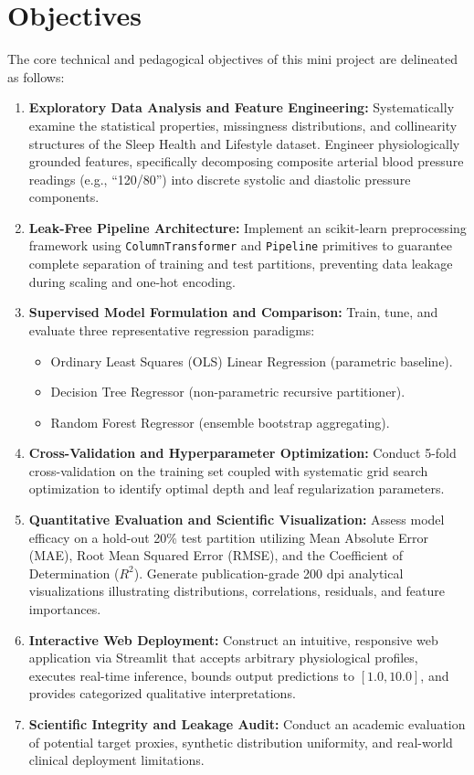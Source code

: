 \documentclass[12pt,a4paper]{article}
\begin{document}
\section{Objectives}
The core technical and pedagogical objectives of this mini project are delineated as follows:
\begin{enumerate}
    \item \textbf{Exploratory Data Analysis and Feature Engineering:} Systematically examine the statistical properties, missingness distributions, and collinearity structures of the Sleep Health and Lifestyle dataset. Engineer physiologically grounded features, specifically decomposing composite arterial blood pressure readings (e.g., ``120/80'') into discrete systolic and diastolic pressure components.
    \item \textbf{Leak-Free Pipeline Architecture:} Implement an scikit-learn preprocessing framework using \texttt{ColumnTransformer} and \texttt{Pipeline} primitives to guarantee complete separation of training and test partitions, preventing data leakage during scaling and one-hot encoding.
    \item \textbf{Supervised Model Formulation and Comparison:} Train, tune, and evaluate three representative regression paradigms:
    \begin{itemize}
        \item Ordinary Least Squares (OLS) Linear Regression (parametric baseline).
        \item Decision Tree Regressor (non-parametric recursive partitioner).
        \item Random Forest Regressor (ensemble bootstrap aggregating).
    \end{itemize}
    \item \textbf{Cross-Validation and Hyperparameter Optimization:} Conduct 5-fold cross-validation on the training set coupled with systematic grid search optimization to identify optimal depth and leaf regularization parameters.
    \item \textbf{Quantitative Evaluation and Scientific Visualization:} Assess model efficacy on a hold-out 20\% test partition utilizing Mean Absolute Error (MAE), Root Mean Squared Error (RMSE), and the Coefficient of Determination ($R^2$). Generate publication-grade 200 dpi analytical visualizations illustrating distributions, correlations, residuals, and feature importances.
    \item \textbf{Interactive Web Deployment:} Construct an intuitive, responsive web application via Streamlit that accepts arbitrary physiological profiles, executes real-time inference, bounds output predictions to $[1.0, 10.0]$, and provides categorized qualitative interpretations.
    \item \textbf{Scientific Integrity and Leakage Audit:} Conduct an academic evaluation of potential target proxies, synthetic distribution uniformity, and real-world clinical deployment limitations.
\end{enumerate}
\end{document}
